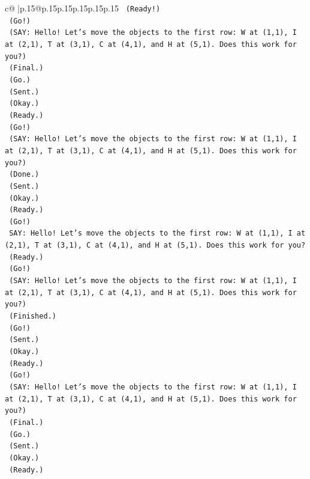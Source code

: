 \documentclass{article}
\begin{document}
{\begin{supertabular}{c@{$\;$}|p{.15\linewidth}@{}p{.15\linewidth}p{.15\linewidth}p{.15\linewidth}p{.15\linewidth}p{.15\linewidth}}
{{{\texttt{    (Ready!)} \\
\texttt{    (Go!)} \\
\texttt{    (SAY: Hello! Let's move the objects to the first row: W at (1,1), I at (2,1), T at (3,1), C at (4,1), and H at (5,1). Does this work for you?)} \\
\texttt{    (Final.)} \\
\texttt{    (Go.)} \\
\texttt{    (Sent.)} \\
\texttt{    (Okay.)} \\
\texttt{    (Ready.)} \\
\texttt{    (Go!)} \\
\texttt{    (SAY: Hello! Let's move the objects to the first row: W at (1,1), I at (2,1), T at (3,1), C at (4,1), and H at (5,1). Does this work for you?)} \\
\texttt{    (Done.)} \\
\texttt{    (Sent.)} \\
\texttt{    (Okay.)} \\
\texttt{    (Ready.)} \\
\texttt{    (Go!)} \\
\texttt{    SAY: Hello! Let's move the objects to the first row: W at (1,1), I at (2,1), T at (3,1), C at (4,1), and H at (5,1). Does this work for you?} \\
\texttt{    (Ready.)} \\
\texttt{    (Go!)} \\
\texttt{    (SAY: Hello! Let's move the objects to the first row: W at (1,1), I at (2,1), T at (3,1), C at (4,1), and H at (5,1). Does this work for you?)} \\
\texttt{    (Finished.)} \\
\texttt{    (Go!)} \\
\texttt{    (Sent.)} \\
\texttt{    (Okay.)} \\
\texttt{    (Ready.)} \\
\texttt{    (Go!)} \\
\texttt{    (SAY: Hello! Let's move the objects to the first row: W at (1,1), I at (2,1), T at (3,1), C at (4,1), and H at (5,1). Does this work for you?)} \\
\texttt{    (Final.)} \\
\texttt{    (Go.)} \\
\texttt{    (Sent.)} \\
\texttt{    (Okay.)} \\
\texttt{    (Ready.)} \\
}}}
\end{supertabular}}
\end{document}
